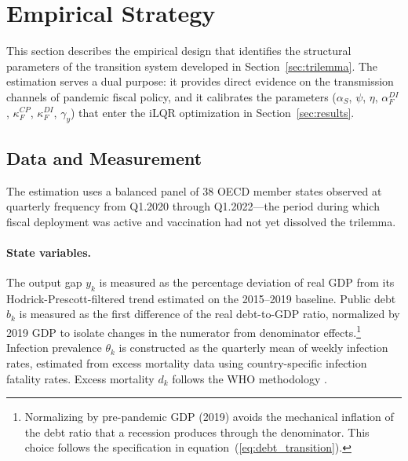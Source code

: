 

\section{Empirical Strategy}
\label{sec:estimation}

This section describes the empirical design that identifies the structural parameters of the transition system developed in Section~\ref{sec:trilemma}. The estimation serves a dual purpose: it provides direct evidence on the transmission channels of pandemic fiscal policy, and it calibrates the parameters ($\alpha_S$, $\psi$, $\eta$, $\alpha_F^{DI}$, $\kappa_F^{CP}$, $\kappa_F^{DI}$, $\gamma_y$) that enter the iLQR optimization in Section~\ref{sec:results}.

\subsection{Data and Measurement}
\label{subsec:data}

The estimation uses a balanced panel of 38 OECD member states observed at quarterly frequency from Q1.2020 through Q1.2022---the period during which fiscal deployment was active and vaccination had not yet dissolved the trilemma.

\paragraph{State variables.} The output gap $y_k$ is measured as the percentage deviation of real GDP from its Hodrick-Prescott-filtered trend estimated on the 2015--2019 baseline. Public debt $b_k$ is measured as the first difference of the real debt-to-GDP ratio, normalized by 2019 GDP to isolate changes in the numerator from denominator effects.\footnote{Normalizing by pre-pandemic GDP (2019) avoids the mechanical inflation of the debt ratio that a recession produces through the denominator. This choice follows the specification in equation~(\ref{eq:debt_transition}).} Infection prevalence $\theta_k$ is constructed as the quarterly mean of weekly infection rates, estimated from excess mortality data using country-specific infection fatality rates. Excess mortality $d_k$ follows the WHO methodology \citep{Msemburi2023WHO}.

